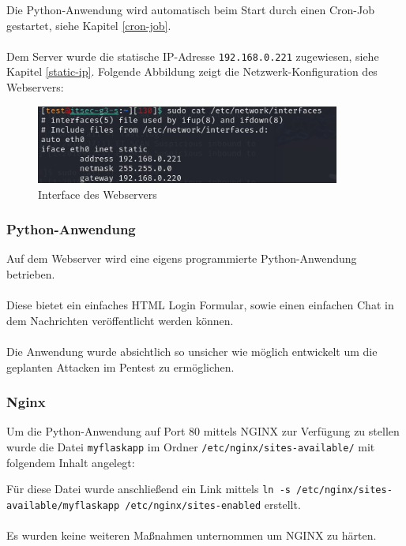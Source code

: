 \documentclass[
    a4paper,
    pagesize,
	pdftex,
    12pt,
]{scrartcl}
\begin{document}
Die Python-Anwendung wird automatisch beim Start durch einen Cron-Job gestartet, siehe Kapitel \ref{cron-job}. \\ \\
Dem Server wurde die statische IP-Adresse \lstinline[breaklines]|192.168.0.221| zugewiesen, siehe Kapitel \ref{static-ip}. Folgende Abbildung zeigt die Netzwerk-Konfiguration des Webservers:
\begin{figure}[!ht]
	\centering
	\includegraphics[width=10cm]{interface-webserver.png}
	\caption{Interface des Webservers}
	\label{fig:interface-webserver}
\end{figure}

\subsubsection{Python-Anwendung}
Auf dem Webserver wird eine eigens programmierte Python-Anwendung betrieben. \\ \\
Diese bietet ein einfaches HTML Login Formular, sowie einen einfachen Chat in dem Nachrichten veröffentlicht werden können. \\ \\
Die Anwendung wurde absichtlich so unsicher wie möglich entwickelt um die geplanten Attacken im Pentest zu  ermöglichen.

\subsubsection{Nginx}
Um die Python-Anwendung auf Port 80 mittels NGINX zur  Verfügung zu stellen wurde die Datei \lstinline[breaklines]|myflaskapp| im Ordner \lstinline[breaklines]|/etc/nginx/sites-available/| mit folgendem Inhalt angelegt:

Für diese Datei wurde anschließend ein Link mittels 
\lstinline[breaklines]|ln -s /etc/nginx/sites-available/myflaskapp /etc/nginx/sites-enabled| erstellt. \\ \\
Es wurden keine weiteren Maßnahmen unternommen um NGINX zu härten.
\end{document}
